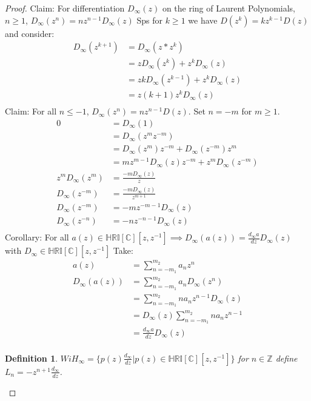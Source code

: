 \documentclass[10pt, oneside]{article}
\newcommand{\C}{\mathbb{C}}
\newcommand{\Z}{\mathbb{Z}}
\newcommand{\HRI}{\mathbb{HRI}}
\newtheorem{defn}{Definition}
\begin{document}
\begin{proof}
    Claim: For differentiation $D_{\infty}(z)$ on the ring of Laurent Polynomials, $n \geq 1$, $D_{\infty}(z^{n})=nz^{n-1}D_{\infty}(z)$
    Sps for $k \geq 1$ we have $D(z^{k})=kz^{k-1}D(z)$ and consider:
    \begin{align*}
        D_{\infty}(z^{k+1}) &= D_{\infty}(z*z^{k})\\
        &= z D_{\infty}(z^k)+z^k D_{\infty}(z) \\
        &= z k D_{\infty}(z^{k-1}) + z^k D_{\infty}(z) \\
        &= z (k+1) z^k D_{\infty}(z) \\
    \end{align*}
    Claim: For all $n \leq -1$, $D_{\infty}(z^{n}) = nz^{n-1} D(z)$. Set $n = -m$ for $m \geq 1$.
    \begin{align*}
        0 &= D_{\infty}(1)\\ 
        &= D_{\infty}(z^{m}z^{-m})\\
        &= D_{\infty}(z^m) z^{-m} + D_{\infty}(z^{-m})z^m \\
        &= mz^{m-1} D_{\infty}(z) z^{-m} + z^m D_{\infty}(z^{-m}) \\
        z^{m} D_{\infty} (z^{m}) &= \frac{-m D_{\infty}(z)}{z} \\
        D_{\infty}(z^{-m}) &= \frac{-m D_{\infty}(z)}{z^{m+1}} \\
        D_{\infty}(z^{-m}) &= -m z^{-m-1} D_{\infty}(z) \\
        D_{\infty}(z^{-n}) &= -n z^{-n-1} D_{\infty}(z) \\
    \end{align*}
    Corollary: For all $a(z) \in \HRI[\C][z,z^{-1}] \implies D_{\infty}(a(z)) = \frac{d_{\infty}a}{dz}D_{\infty}(z)$ with $D_{\infty} \in \HRI[\C][z,z^{-1}]$
    Take:
    \begin{align*}
        a(z) &= \sum_{n=-m_{1}}^{m_{2}} a_{n} z^n \\
        D_{\infty} (a(z)) &= \sum_{n=-m_{1}}^{m_{2}} a_{n} D_{\infty}(z^n) \\
        &= \sum_{n=-m_{1}}^{m_{2}} n a_{n} z^{n-1} D_{\infty}(z) \\
        &= D_{\infty}(z) \sum_{n=-m_{1}}^{m_{2}} n a_{n} z^{n-1} \\
        &= \frac{d_{\infty}a}{dz} D_{\infty}(z) \\
    \end{align*}
    \begin{defn}
        $WiH_{\infty} = \{ p(z) \frac{d_{\infty}}{dz} | p(z) \in \HRI[\C][z,z^{-1}] \}$ for $n \in \Z$ define $L_{n} = -z^{n+1} \frac{d_{\infty}}{dz}$.

\end{defn}
\end{proof}
\end{document}
